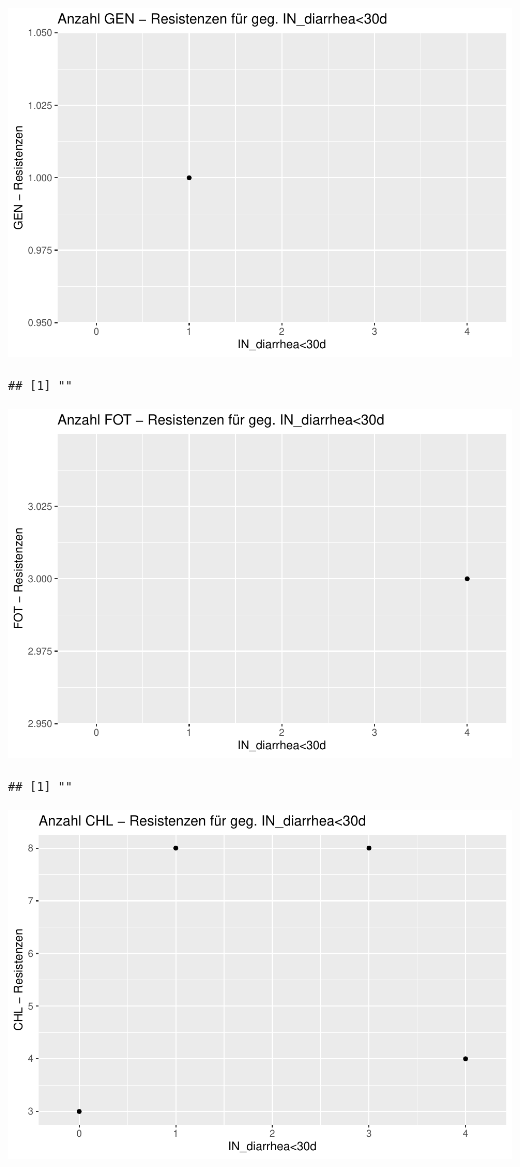 \documentclass[
]{article}
\begin{document}
\includegraphics{NResistenzen_files/figure-latex/unnamed-chunk-6-34.pdf}

\begin{verbatim}
## [1] ""
\end{verbatim}

\includegraphics{NResistenzen_files/figure-latex/unnamed-chunk-6-35.pdf}

\begin{verbatim}
## [1] ""
\end{verbatim}

\includegraphics{NResistenzen_files/figure-latex/unnamed-chunk-6-36.pdf}
\end{document}
